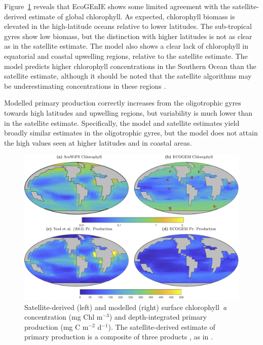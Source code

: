 \documentclass[gmd, manuscript]{copernicus}
\begin{document}
{Figure~\ref{fig:chl_prpr} reveals that EcoGEnIE shows some limited agreement with the satellite-derived estimate of global chlorophyll. As expected, chlorophyll biomass is elevated in the high-latitude oceans relative to lower latitudes. The sub-tropical gyres show low biomass, but the distinction with higher latitudes is not as clear as in the satellite estimate. The model also shows a clear lack of chlorophyll in equatorial and coastal upwelling regions, relative to the satellite estimate. The model predicts higher chlorophyll concentrations in the Southern Ocean than the satellite estimate, although it should be noted that the satellite algorithms may be underestimating concentrations in these regions \citep[Figure~\ref{fig:jgofs_chl} and][]{Dierssen:2010}.

Modelled primary production correctly increases from the oligotrophic gyres towards high latitudes and upwelling regions, but variability is much lower than in the satellite estimate. Specifically, the model and satellite estimates yield broadly similar estimates in the oligotrophic gyres, but the model does not attain the high values seen at higher latitudes and in coastal areas.

\begin{figure}[htbp]
\includegraphics[width=0.95\linewidth]{Final_figures/Fig_14.png}
\caption{Satellite-derived (left) and modelled (right) surface chlorophyll~\textit{a} concentration (mg Chl m$^{-3}$) and depth-integrated primary production (mg C m$^{-2}$ d$^{-1}$). The satellite-derived estimate of primary production is a composite of three products \citep{Behrenfeld:1997,Carr:2006,Westberry:2008}, as in \citet[][their Figure~12]{Yool:2013a}.}
\label{fig:chl_prpr}
\end{figure}

}
\end{document}
